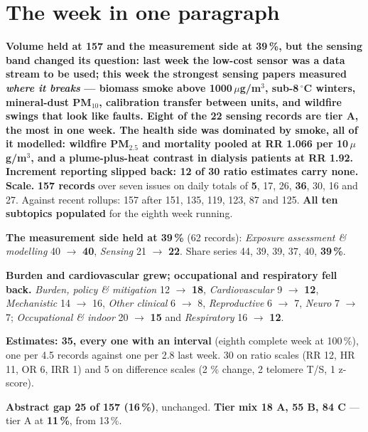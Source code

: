 \documentclass[10pt]{article}
\begin{document}
\vspace{6mm}

\section*{\sffamily\bfseries\color{Deep}The week in one paragraph}
\vspace{-1.5mm}{\color{Teal}\rule{\linewidth}{1.1pt}}\vspace{2.5mm}

\begin{keybox}
{\sffamily\bfseries\small\color{Deep}Volume held at 157 and the measurement side at 39\,\%, but the sensing band
changed its question: last week the low-cost sensor was a data stream to be used; this week the strongest sensing
papers measured \emph{where it breaks} --- biomass smoke above 1000\,$\mu$g/m$^3$, sub-8\,$^\circ$C winters, mineral-dust
PM$_{10}$, calibration transfer between units, and wildfire swings that look like faults. Eight of the 22 sensing
records are tier A, the most in one week. The health side was dominated by smoke, all of it modelled: wildfire
PM$_{2.5}$ and mortality pooled at RR 1.066 per 10\,$\mu$g/m$^3$, and a plume-plus-heat contrast in dialysis
patients at RR 1.92. Increment reporting slipped back: 12 of 30 ratio estimates carry none.}\\[1.4mm]
\footnotesize
\textbf{Scale.} \textbf{157 records} over seven issues on daily totals of \textbf{5}, 17, 26, \textbf{36}, 30,
16 and 27. Against recent rollups: 157 after 151, 135, 119, 123, 87 and 125. \textbf{All ten subtopics populated}
for the eighth week running.

\textbf{The measurement side held at 39\,\%} (62 records): \textit{Exposure assessment \& modelling} 40
$\rightarrow$ \textbf{40}, \textit{Sensing} 21 $\rightarrow$ \textbf{22}. Share series 44, 39, 39, 37, 40,
\textbf{39\,\%}.

\textbf{Burden and cardiovascular grew; occupational and respiratory fell back.} \textit{Burden, policy \&
mitigation} 12 $\rightarrow$ \textbf{18}, \textit{Cardiovascular} 9 $\rightarrow$ \textbf{12}, \textit{Mechanistic}
14 $\rightarrow$ 16, \textit{Other clinical} 6 $\rightarrow$ 8, \textit{Reproductive} 6 $\rightarrow$ 7,
\textit{Neuro} 7 $\rightarrow$ 7; \textit{Occupational \& indoor} 20 $\rightarrow$ \textbf{15} and
\textit{Respiratory} 16 $\rightarrow$ \textbf{12}.

\textbf{Estimates: 35, every one with an interval} (eighth complete week at 100\,\%), one per 4.5 records against
one per 2.8 last week. 30 on ratio scales (RR 12, HR 11, OR 6, IRR 1) and 5 on difference scales (2 \% change,
2 telomere T/S, 1 z-score).

\textbf{Abstract gap 25 of 157 (16\,\%)}, unchanged. \textbf{Tier mix 18 A, 55 B, 84 C} --- tier A at
\textbf{11\,\%}, from 13\,\%.
\end{keybox}
\end{document}
